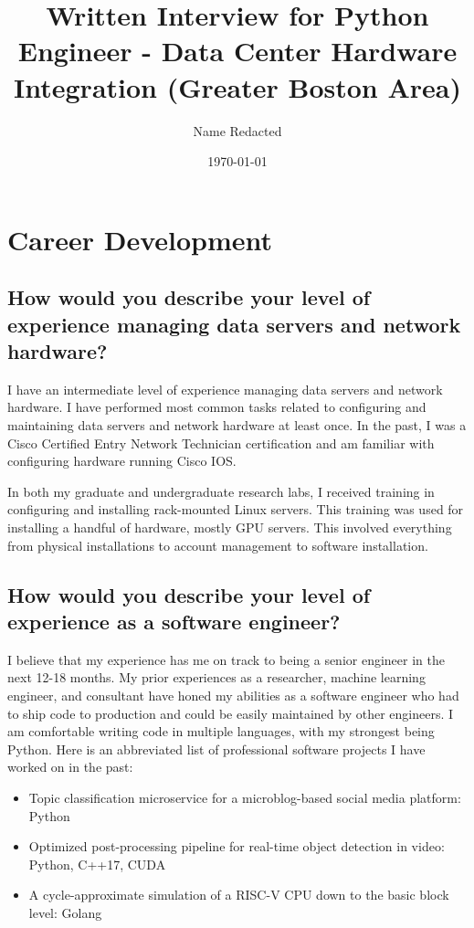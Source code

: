 \documentclass{article}
\title{Written Interview for Python Engineer - Data Center Hardware Integration (Greater Boston Area)}
\author{Name Redacted}
\date{\today}
\begin{document}
\maketitle

\section{Career Development}
\subsection{How would you describe your level of experience managing data servers and network hardware?}

I have an intermediate level of experience managing data servers and network
hardware. I have performed most common tasks related to configuring and
maintaining data servers and network hardware at least once. In the past, I was
a Cisco Certified Entry Network Technician certification and am familiar with
configuring hardware running Cisco IOS.

In both my graduate and undergraduate research labs, I received training in
configuring and installing rack-mounted Linux servers. This training was used
for installing a handful of hardware, mostly GPU servers.  This involved
everything from physical installations to account management to software
installation.

\subsection{How would you describe your level of experience as a software
  engineer?}

I believe that my experience has me on track to being a senior engineer in the
next 12-18 months. My prior experiences as a researcher, machine learning
engineer, and consultant have honed my abilities as a software engineer who had
to ship code to production and could be easily maintained by other engineers. I
am comfortable writing code in multiple languages, with my strongest being
Python. Here is an abbreviated list of professional software projects I have worked
on in the past:
\begin{itemize}
  \item Topic classification microservice for a microblog-based social media platform: Python
  \item Optimized post-processing pipeline for real-time object detection in video: Python, C++17, CUDA
  \item A cycle-approximate simulation of a RISC-V CPU down to the basic block level: Golang
\end{itemize}
\end{document}
